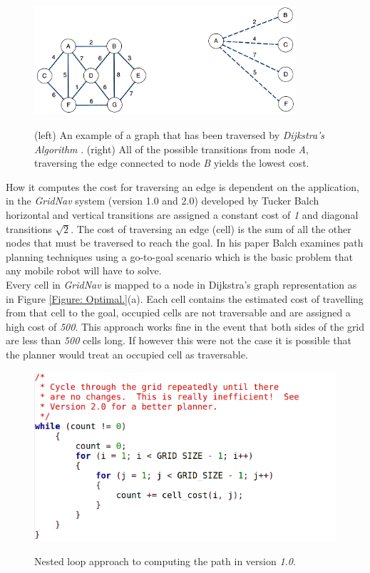 \begin{figure}[htbp]

\center \includegraphics[width=275pt]{illustrations/graph}\\
\caption{(left) An example of a graph that has been traversed by \textit{Dijkstra's Algorithm} \cite{DIJKSTRA}. (right) All of the possible transitions from node \textit{A}, traversing the edge connected to node \textit{B} yields the lowest cost. \cite{ARNIE13}} 
\label{Figure: Graph.}

\end{figure}

\noindent
How it computes the cost for traversing an edge is dependent on the application, in the \textit{GridNav} \cite{GRIDNAV95} system (version 1.0 and 2.0) developed by Tucker Balch horizontal and vertical transitions are assigned a constant cost of \textit{1} and diagonal transitions $\sqrt{2}$. The cost of traversing an edge (cell) is the sum of all the other nodes that must be traversed to reach the goal. In his paper Balch examines path planning techniques using a go-to-goal scenario which is the basic problem that any mobile robot will have to solve.\\

\noindent
Every cell in \textit{GridNav} is mapped to a node in Dijkstra's graph representation as in Figure \ref{Figure: Optimal.}(a). Each cell contains the estimated cost of travelling from that cell to the goal, occupied cells are not traversable and are assigned a high cost of \textit{500}. This approach works fine in the event that both sides of the grid are less than \textit{500} cells long. If however this were not the case it is possible that the planner would treat an occupied cell as traversable.

\begin{figure}[htbp]

\center \includegraphics[width=325pt]{illustrations/version1}\\
\caption{Nested loop approach to computing the path in version \textit{1.0}. \cite{GRIDNAV95}}
\label{Figure: GridNav Version 1.0.}

\end{figure}


